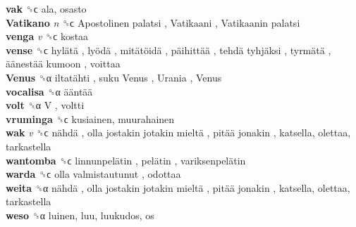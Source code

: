 \textbf{vak} ␝ϲ  ala, osasto  \\
\textbf{Vatikano} \emph{n}  ␝ϲ   Apostolinen palatsi ,  Vatikaani ,  Vatikaanin palatsi   \\
\textbf{venga} \emph{v}  ␝ϲ  kostaa  \\
\textbf{vense} ␝ϲ   hylätä ,  lyödä ,  mitätöidä ,  päihittää ,  tehdä tyhjäksi ,  tyrmätä ,  äänestää kumoon , voittaa  \\
\textbf{Venus} ␝α   iltatähti ,  suku Venus ,  Urania ,  Venus   \\
\textbf{vocalisa} ␝α   ääntää   \\
\textbf{volt} ␝α   V , voltti  \\
\textbf{vruminga} ␝ϲ  kusiainen, muurahainen  \\
\textbf{wak} \emph{v}  ␝ϲ   nähdä ,  olla jostakin jotakin mieltä ,  pitää jonakin , katsella, olettaa, tarkastella  \\
\textbf{wantomba} ␝ϲ   linnunpelätin ,  pelätin ,  variksenpelätin   \\
\textbf{warda} ␝ϲ   olla valmistautunut , odottaa  \\
\textbf{weita} ␝α   nähdä ,  olla jostakin jotakin mieltä ,  pitää jonakin , katsella, olettaa, tarkastella  \\
\textbf{weso} ␝α  luinen, luu, luukudos, os  \\
